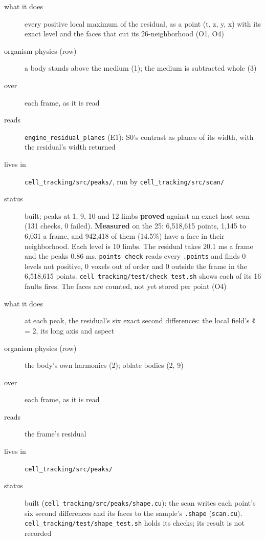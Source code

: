 \begin{description}
\item[{what it does}] every positive local maximum of the residual, as a point (t, z, y, x) with its exact level and the faces that cut its 26-neighborhood (O1, O4)
\item[{organism physics (row)}] a body stands above the medium (1); the medium is subtracted whole (3)
\item[{over}] each frame, as it is read
\item[{reads}] \texttt{engine\_\allowbreak{}residual\_\allowbreak{}planes} (E1): S0's contrast as planes of its width, with the residual's width returned
\item[{lives in}] \texttt{cell\_\allowbreak{}tracking/\allowbreak{}src/\allowbreak{}peaks/\allowbreak{}}, run by \texttt{cell\_\allowbreak{}tracking/\allowbreak{}src/\allowbreak{}scan/\allowbreak{}}
\item[{status}] built; peaks at 1, 9, 10 and 12 limbs \textbf{proved} against an exact host scan (131 checks, 0 failed). \textbf{Measured} on the 25: 6,518,615 points, 1,145 to 6,031 a frame, and 942,418 of them (14.5\%) have a face in their neighborhood. Each level is 10 limbs. The residual takes 20.1 ms a frame and the peaks 0.86 ms. \texttt{points\_\allowbreak{}check} reads every \texttt{.\allowbreak{}points} and finds 0 levels not positive, 0 voxels out of order and 0 outside the frame in the 6,518,615 points. \texttt{cell\_\allowbreak{}tracking/\allowbreak{}test/\allowbreak{}check\_\allowbreak{}test.\allowbreak{}sh} shows each of its 16 faults fires. The faces are counted, not yet stored per point (O4)
\end{description}

\begin{description}
\item[{what it does}] at each peak, the residual's six exact second differences: the local field's ℓ = 2, its long axis and aspect
\item[{organism physics (row)}] the body's own harmonics (2); oblate bodies (2, 9)
\item[{over}] each frame, as it is read
\item[{reads}] the frame's residual
\item[{lives in}] \texttt{cell\_\allowbreak{}tracking/\allowbreak{}src/\allowbreak{}peaks/\allowbreak{}}
\item[{status}] built (\texttt{cell\_\allowbreak{}tracking/\allowbreak{}src/\allowbreak{}peaks/\allowbreak{}shape.\allowbreak{}cu}): the scan writes each point's six second differences and its faces to the sample's \texttt{.\allowbreak{}shape} (\texttt{scan.\allowbreak{}cu}). \texttt{cell\_\allowbreak{}tracking/\allowbreak{}test/\allowbreak{}shape\_\allowbreak{}test.\allowbreak{}sh} holds its checks; its result is not recorded
\end{description}


